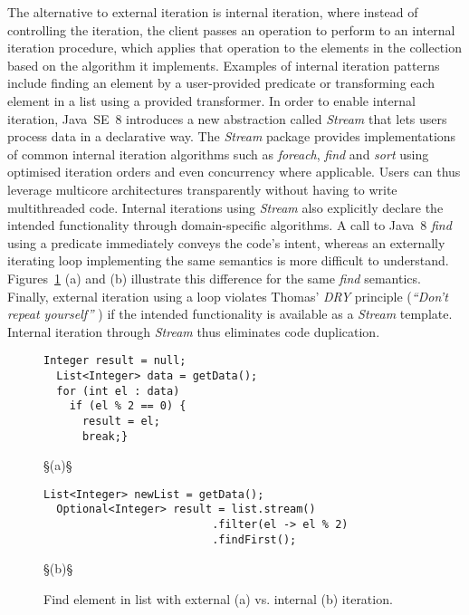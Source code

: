 \documentclass[runningheads,a4paper]{llncs}
\begin{document}
The alternative to external iteration is internal iteration, where
instead of controlling the iteration, the client passes an operation to
perform to an internal iteration procedure, which applies that
operation to the elements in the collection based on the algorithm it
implements. Examples of internal iteration patterns include finding an
element by a user-provided predicate or transforming each element
in a list using a provided transformer.
%
In order to enable internal iteration, Java~SE~8 introduces a new
abstraction called {\em Stream} that lets users process data in a
declarative way.  The {\em Stream} package provides implementations of
common internal iteration algorithms such as {\em foreach}, {\em find}
and {\em sort} using optimised iteration orders and even concurrency
where applicable.  Users can thus leverage multicore architectures
transparently without having to write multithreaded code.  Internal
iterations using {\em Stream} also explicitly declare the intended
functionality through domain-specific algorithms.  A call to Java~8
{\em find} using a predicate immediately conveys the code's intent,
whereas an externally iterating  loop implementing the same
semantics is more difficult to understand.
Figures~\ref{ex:find-query} (a) and (b) illustrate this
difference for the same {\em find} semantics.  Finally, external
iteration using a  loop violates Thomas' {\em DRY} principle
({\em ``Don't repeat yourself''} \cite{thomas}) if the intended
functionality is available as a {\em Stream} template.  Internal
iteration through {\em Stream} thus eliminates code duplication.

\begin{figure}
  \begin{lstlisting}[mathescape=true]
  Integer result = null;
  List<Integer> data = getData();
  for (int el : data)
    if (el % 2 == 0) {
      result = el; 
      break;}
\end{lstlisting} §\hspace{24em}\small{(a)}§
  \begin{lstlisting}[mathescape=true]
  List<Integer> newList = getData();
  Optional<Integer> result = list.stream()
                          .filter(el -> el % 2)
                          .findFirst();
\end{lstlisting} §\hspace{24em}\small{(b)}§
\caption{Find element in list with external (a) vs. internal (b) iteration.}
\label{ex:find-query}
\end{figure}
\end{document}
